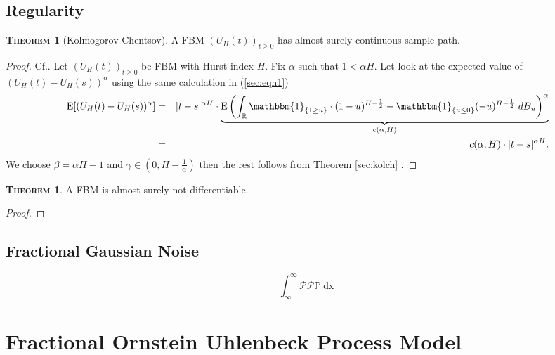 \documentclass[a4paper, twoside, 11pt]{article}
\theoremstyle{definition}
\newtheorem{theorem}[definition]{\scshape Theorem}
\newcommand{\brkt}[1]{\left({#1} \right)}
\begin{document}
\subsection{Regularity}
\begin{theorem}[Kolmogorov Chentsov]
  A FBM $(U_H(t))_{t\ge 0}$ has almost surely continuous sample path.  
\end{theorem}

\begin{proof}
  Cf.\cite{mandelbrot}. Let $(U_H(t))_{t\ge 0}$ be FBM with Hurst index $H$. Fix $\alpha$ such that $1 < \alpha H$. Let look at the expected value of $(U_H(t) - U_H(s))^\alpha$ using the same calculation in (\ref{sec:eqn1})
  \begin{eqnarray}
	\mathrm{E} [(U_H(t) - U_H(s))^\alpha] &=& |t-s|^{\alpha H} \cdot \underbrace{\mathrm{E}\brkt{\int_{\mathbb{R}} \mathbbm{1}_{\{1\ge u\}}\cdot (1-u)^{H-\frac{1}{2}} - \mathbbm{1}_{\{u\le 0\}} (-u)^{H-\frac{1}{2}} \, \mathop{dB_u}}^\alpha}_{c(\alpha,H)}\nonumber\\
	&=& c(\alpha,H) \cdot |t-s|^{\alpha H}.
	\label{sec:eqn5}
  \end{eqnarray}
  We choose $\beta = \alpha H -1$ and $\gamma \in (0, H-\frac{1}{\alpha})$ then the rest follows from Theorem \ref{sec:kolch} .
\end{proof}

\begin{theorem}
  A FBM is almost surely not differentiable.
\end{theorem}

\begin{proof}

\end{proof}

\subsection{Fractional Gaussian Noise}
\begin{equation}
  \int_{\infty}^{\infty} \mathcal{P} \mathscr{P} \mathbb{P} \mathop{dx}
\end{equation}
\newpage
\section{Fractional Ornstein Uhlenbeck Process Model}
\setcounter{equation}{0}

\newpage

\end{document}
